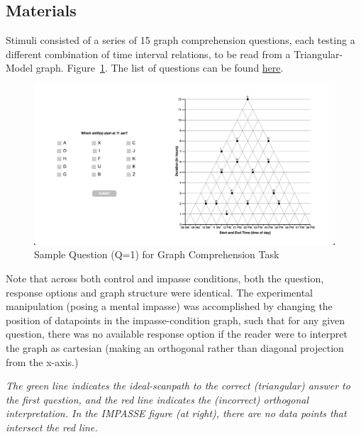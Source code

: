 \documentclass[
  letterpaper,
  DIV=11,
  numbers=noendperiod]{scrreprt}
\begin{document}
\hypertarget{materials}{%
\subsection*{Materials}\label{materials}}

Stimuli consisted of a series of 15 graph comprehension questions, each
testing a different combination of time interval relations, to be read
from a Triangular-Model graph. Figure~\ref{fig-sample}. The list of
questions can be found \href{static/stimuli/sgcx_questions.csv}{here}.

\begin{figure}

{\centering \includegraphics{analysis/SGC3A/static/stimuli/sample_task.png}

}

\caption{\label{fig-sample}Sample Question (Q=1) for Graph Comprehension
Task}

\end{figure}

Note that across both control and impasse conditions, both the question,
response options and graph structure were identical. The experimental
manipulation (posing a mental impasse) was accomplished by changing the
position of datapoints in the impasse-condition graph, such that for any
given question, there was no available response option if the reader
were to interpret the graph as cartesian (making an orthogonal rather
than diagonal projection from the x-axis.)

\emph{The green line indicates the ideal-scanpath to the correct
(triangular) answer to the first question, and the red line indicates
the (incorrect) orthogonal interpretation. In the IMPASSE figure (at
right), there are no data points that intersect the red line.}
\end{document}
